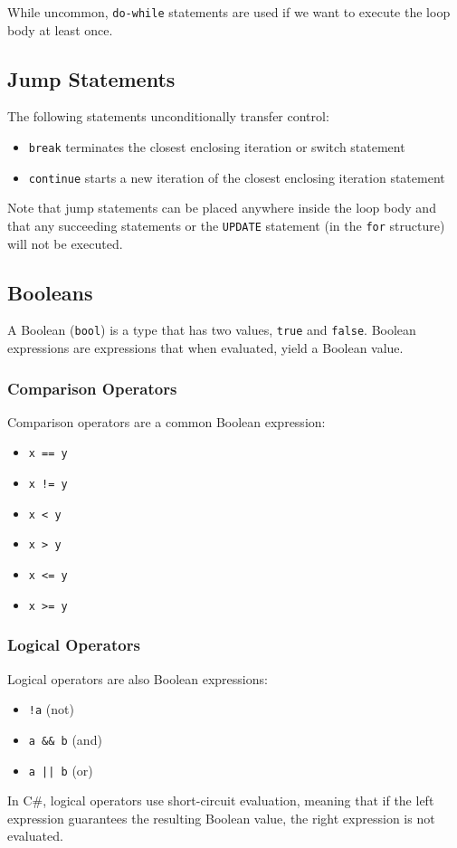 \documentclass{article}
\begin{document}
While uncommon, \lstinline{do-while} statements are used if we want to execute
the loop body at least once.
\subsection{Jump Statements}
The following statements unconditionally transfer control:
\begin{itemize}
    \item \lstinline{break} terminates the closest enclosing iteration or switch statement
    \item \lstinline{continue} starts a new iteration of the closest enclosing iteration statement
\end{itemize}
Note that jump statements can be placed anywhere inside the loop body and that any succeeding
statements or the \lstinline{UPDATE} statement (in the \lstinline{for} structure) %
will not be executed.
\subsection{Booleans}
A Boolean (\lstinline{bool}) is a type that has two values,
\lstinline{true} and \lstinline{false}.
Boolean expressions are expressions that when evaluated, yield a Boolean value.
\subsubsection{Comparison Operators}
Comparison operators are a common Boolean expression:
\begin{itemize}
    \item \lstinline{x == y}
    \item \lstinline+x != y+ %
    \item \lstinline{x < y}
    \item \lstinline{x > y}
    \item \lstinline{x <= y}
    \item \lstinline{x >= y}
\end{itemize}
\subsubsection{Logical Operators}
Logical operators are also Boolean expressions:
\begin{itemize}
    \item \lstinline+!a+ (not)
    \item \lstinline{a && b} (and)
    \item \lstinline{a || b} (or)
\end{itemize}
In C\#, logical operators use short-circuit evaluation, meaning that
if the left expression guarantees the resulting Boolean value,
the right expression is not evaluated.
\end{document}
